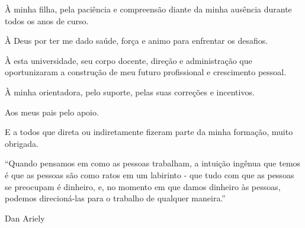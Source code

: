 \documentclass[
	12pt,
	openright,
	oneside, %
	a4paper,
	chapter=TITLE,
	section=TITLE,
	english,
	brazil %
	]{abntex2-udesc}
\begin{document}
\begin{dedicatoria}
   \vspace*{\fill}
   \hspace{.45\textwidth}
   \begin{minipage}{.5\textwidth}
      \SingleSpacing
À minha filha, pela paciência e compreensão diante da minha ausência durante todos os anos de curso.
   \end{minipage}
	\vspace*{\fill}
\end{dedicatoria}

\begin{agradecimentos}
À Deus por ter me dado saúde, força e animo para enfrentar os desafios.

À esta universidade, seu corpo docente, direção e administração que oportunizaram a construção de meu futuro profissional e crescimento pessoal.

À minha orientadora, pelo suporte, pelas suas correções e incentivos.

Aos meus pais pelo apoio.

E a todos que direta ou indiretamente fizeram parte da minha formação, muito obrigada.
\end{agradecimentos}

\begin{epigrafe}
    \vspace*{\fill}
   \hspace{.45\textwidth}
   \begin{minipage}{.5\textwidth}
      \SingleSpacing

{\small``Quando pensamos em como as pessoas trabalham, a
intuição ingênua que temos é que as pessoas são como
ratos em um labirinto - que tudo com que as pessoas se
preocupam é dinheiro, e, no momento em que damos
dinheiro às pessoas, podemos direcioná-las para o
trabalho de qualquer maneira.''

\vspace{\onelineskip}

Dan Ariely}
   \end{minipage}
	\vspace*{\fill}
\end{epigrafe}
\end{document}
